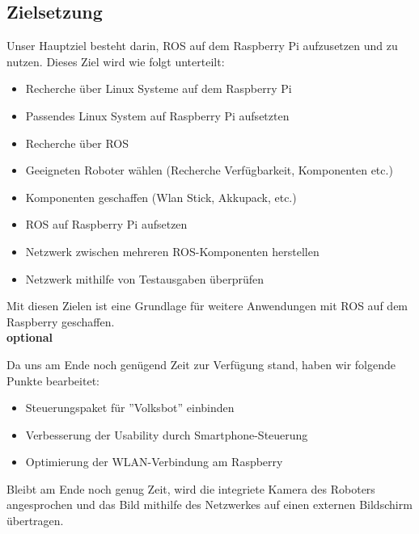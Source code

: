 \documentclass[12pt]{article}
\begin{document}



\subsection{Zielsetzung}


Unser Hauptziel besteht darin, ROS auf dem Raspberry Pi aufzusetzen und zu nutzen. Dieses Ziel wird wie folgt unterteilt:\\

\begin{itemize}

\item Recherche über Linux Systeme auf dem Raspberry Pi 
\item Passendes Linux System auf Raspberry Pi aufsetzten			
\item Recherche über ROS
\item Geeigneten Roboter wählen (Recherche Verfügbarkeit, Komponenten etc.)
\item Komponenten geschaffen (Wlan Stick, Akkupack, etc.)
\item ROS auf Raspberry Pi aufsetzen
\item Netzwerk zwischen mehreren ROS-Komponenten herstellen
\item Netzwerk mithilfe von Testausgaben überprüfen

\end{itemize}

Mit diesen Zielen ist eine Grundlage für weitere Anwendungen mit ROS auf dem Raspberry geschaffen.\\

{\bf optional}

Da uns am Ende noch genügend Zeit zur Verfügung stand, haben wir folgende Punkte bearbeitet:

\begin{itemize}

\item Steuerungspaket für ''Volksbot'' einbinden
\item Verbesserung der Usability durch Smartphone-Steuerung
\item Optimierung der WLAN-Verbindung am Raspberry
 
\end{itemize}
Bleibt am Ende noch genug Zeit, wird die integriete Kamera des Roboters angesprochen und das Bild mithilfe des Netzwerkes auf einen externen Bildschirm übertragen.
\end{document}
